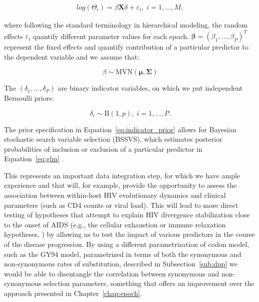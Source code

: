 
\begin{align}
log\left(\Theta_{i}\right)=\beta \mathbf{X} \delta+\varepsilon_{i},\; i=1,\ldots,M,
\label{eq:mixed_model}
\end{align}

\noindent
where following the standard terminology in hierarchical modeling, the random effects $\varepsilon_{i}$ quantify different parameter values for each epoch.
$\mathbf{\beta}=\left(\beta_1,\ldots,\beta_P \right)^T$ represent the fixed effects and quantify contribution of a particular predictor to the dependent variable and we assume that:  

\begin{equation}
\beta \sim \text{MVN}(\boldsymbol{\mu},\boldsymbol{\Sigma})
\label{eq:beta_proposal}
\end{equation}

\noindent
The $\left(\delta_1,\ldots,\delta_P \right)$ are binary indicator variables, on which we put independent Bernoulli priors:

\begin{equation}
\delta_{i} \sim \text{B}\left(1,p\right),\;i=1,\ldots,P.
\label{eq:indicator_prior}
\end{equation}

\noindent
The prior specification in Equation~\ref{eq:indicator_prior} allows for Bayesian stochastic search variable selection (BSSVS), which estimates posterior probabilities of inclusion or exclusion of a particular predictor in Equation~\ref{eq:glm} \cite{Lemey2009}.

This represents an important data integration step, for which we have ample experience \citep{Edo-Matas2011,Streicker2012,Vrancken2014} and that will, for example, provide the opportunity to assess the association between within-host HIV evolutionary dynamics and clinical parameters (such as CD4 counts or viral load). 
This will lead to more direct testing of hypotheses that attempt to explain HIV divergence stabilization close to the onset of AIDS (e.g., the cellular exhaustion or immune relaxation hypotheses, \citep{Lemey2007}) by allowing us to test the impact of various predictors in the course of the disease progression.
By using a different parametrization of codon model, such as the GY94 model, parametrized in terms of both the synonymous and non-synonymous rates of substitution, described in Subsection~\ref{sub:dpp} we would be able to disentangle the correlation between synonymous and non-synonymous selection parameters, something that offers an improvement over the approach presented in Chapter~\ref{chap:epoch}.



